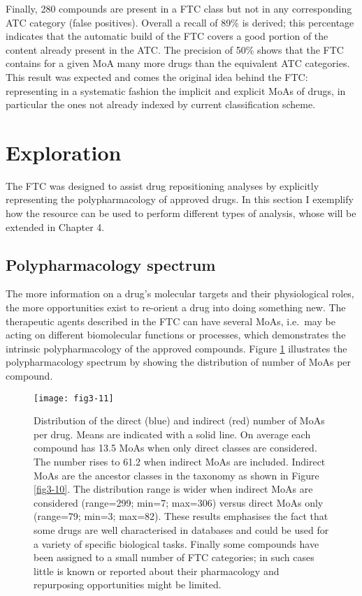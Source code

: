 Finally, 280 compounds are present in a FTC class but not in any corresponding ATC category (false positives). Overall a recall of 89\% is derived; this percentage indicates that the automatic build of the FTC covers a good portion of the content already present in the ATC. The precision of 50\% shows that the FTC contains for a given MoA many more drugs than the equivalent ATC categories. This result was expected and comes the original idea behind the FTC: representing in a systematic fashion the implicit and explicit MoAs of drugs, in particular the ones not already indexed by current classification scheme.

\section{Exploration}
The FTC was designed to assist drug repositioning analyses by explicitly representing the polypharmacology of approved drugs. In this section I exemplify how the resource can be used to perform different types of analysis, whose will be extended in Chapter 4.

\subsection{Polypharmacology spectrum}
The more information on a drug's molecular targets and their physiological roles, the more opportunities exist to re-orient a drug into doing something new. The therapeutic agents described in the FTC can have several MoAs, i.e.\ may be acting on different biomolecular functions or processes, which demonstrates the intrinsic polypharmacology of the approved compounds. 
Figure \ref{fig3-11} illustrates the polypharmacology spectrum by showing the distribution of number of MoAs per compound.

\begin{figure}[H]
    \centering
    \texttt{[image: fig3-11]}
    \caption{Distribution of the direct (blue) and indirect (red) number of MoAs per drug. Means are indicated with a solid line. On average each compound has 13.5 MoAs when only direct classes are considered. The number rises
to 61.2 when indirect MoAs are included. Indirect MoAs are the ancestor classes in the taxonomy as shown in Figure \ref{fig3-10}. The distribution range is wider when indirect MoAs are considered (range=299; min=7; max=306) versus direct MoAs only (range=79; min=3; max=82). These results emphasises the fact that some drugs are well characterised in databases and could be used for a variety of specific biological tasks. Finally some compounds have been assigned to a small number of FTC categories; in such cases little is known or reported about their pharmacology and repurposing opportunities might be limited.}
    \label{fig3-11}
\end{figure}

